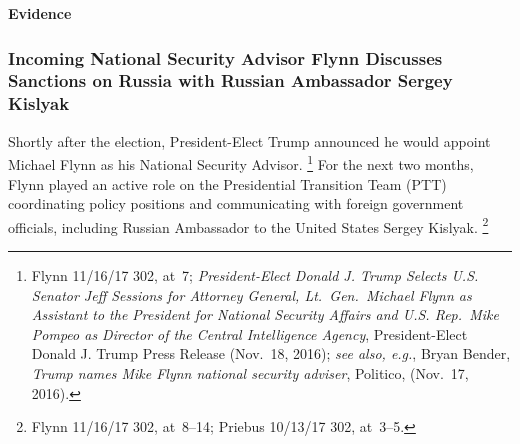 \begin{center}
\textbf{Evidence}
\end{center}

\subsubsection{Incoming National Security Advisor Flynn Discusses Sanctions on Russia with Russian Ambassador Sergey Kislyak}

Shortly after the election, President-Elect Trump announced he would appoint Michael Flynn as his National Security Advisor.%
\footnote{Flynn 11/16/17 302, at~7;
\textit{President-Elect Donald J. Trump Selects U.S. Senator Jeff Sessions for Attorney General, Lt.~Gen.\ Michael Flynn as Assistant to the President for National Security Affairs and U.S. Rep.~Mike Pompeo as Director of the Central Intelligence Agency}, President-Elect Donald J. Trump Press Release (Nov.~18, 2016);
\textit{see also, e.g.}, Bryan Bender, \textit{Trump names Mike Flynn national security adviser}, Politico, (Nov.~17, 2016).}
For the next two months, Flynn played an active role on the Presidential Transition Team (PTT) coordinating policy positions and communicating with foreign government officials, including Russian Ambassador to the United States Sergey Kislyak.%
\footnote{Flynn 11/16/17 302, at~8--14;
Priebus 10/13/17 302, at~3--5.}

